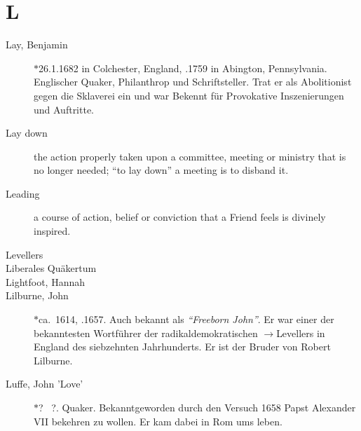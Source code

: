 \section*{L}

\articlesize

\begin{description}

 \item[Lay, Benjamin] $\ast$26.1.1682 in Colchester, England, .1759 in Abington, Pennsylvania. Englischer Quaker, Philanthrop und Schriftsteller. Trat er als Abolitionist gegen die Sklaverei ein und war Bekennt für Provokative Inszenierungen und Auftritte.

 \item[Lay down]
    the action properly taken upon a committee, meeting or ministry that is no longer needed; "`to lay down"' a meeting is to disband it.

 \item[Leading]
    a course of action, belief or conviction that a Friend feels is divinely inspired.

 \item[Levellers]


 \item[Liberales Quäkertum]

 \item[Lightfoot, Hannah]

 \item[Lilburne, John] $\ast$ca.~1614, .1657. Auch bekannt als \textit{"`Freeborn John"'}. Er war einer der bekanntesten Wortführer der radikaldemokratischen $\to$Levellers in England des siebzehnten Jahrhunderts. Er ist der Bruder von Robert Lilburne.

 \item[Luffe, John 'Love'] $\ast$? \dag~?. Quaker. Bekanntgeworden durch den Versuch 1658 Papst Alexander VII bekehren zu wollen. Er kam dabei in Rom ums leben.

 \end{description}
\normalsize
